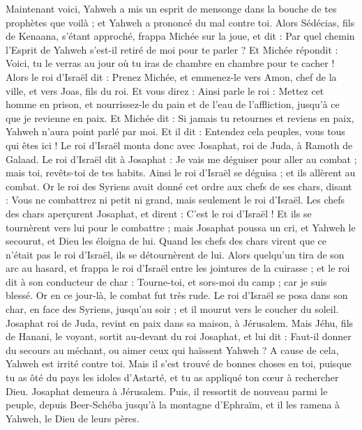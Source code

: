 \begin{multicols}{2}
Maintenant voici, Yahweh a mis un esprit de mensonge dans la bouche de tes prophètes que voilà ; et Yahweh a prononcé du mal contre toi.
Alors Sédécias, fils de Kenaana, s'étant approché, frappa Michée sur la joue, et dit : Par quel chemin l'Esprit de Yahweh s'est-il retiré de moi pour te parler ?
Et Michée répondit : Voici, tu le verras au jour où tu iras de chambre en chambre pour te cacher !
Alors le roi d'Israël dit : Prenez Michée, et emmenez-le vers Amon, chef de la ville, et vers Joas, fils du roi.
Et vous direz : Ainsi parle le roi : Mettez cet homme en prison, et nourrissez-le du pain et de l'eau de l'affliction, jusqu'à ce que je revienne en paix.
Et Michée dit : Si jamais tu retournes et reviens en paix, Yahweh n'aura point parlé par moi. Et il dit : Entendez cela peuples, vous tous qui êtes ici !
Le roi d'Israël monta donc avec Josaphat, roi de Juda, à Ramoth de Galaad.
Le roi d'Israël dit à Josaphat : Je vais me déguiser pour aller au combat ; mais toi, revêts-toi de tes habits. Ainsi le roi d'Israël se déguisa ; et ils allèrent au combat.
Or le roi des Syriens avait donné cet ordre aux chefs de ses chars, disant : Vous ne combattrez ni petit ni grand, mais seulement le roi d'Israël.
Les chefs des chars aperçurent Josaphat, et dirent : C'est le roi d'Israël ! Et ils se tournèrent vers lui pour le combattre ; mais Josaphat poussa un cri, et Yahweh le secourut, et Dieu les éloigna de lui.
Quand les chefs des chars virent que ce n'était pas le roi d'Israël, ils se détournèrent de lui.
Alors quelqu'un tira de son arc au hasard, et frappa le roi d'Israël entre les jointures de la cuirasse ; et le roi dit à son conducteur de char : Tourne-toi, et sors-moi du camp ; car je suis blessé.
Or en ce jour-là, le combat fut très rude. Le roi d'Israël se posa dans son char, en face des Syriens, jusqu'au soir ; et il mourut vers le coucher du soleil.
\VerseOne{}Josaphat roi de Juda, revint en paix dans sa maison, à Jérusalem.
Mais Jéhu, fils de Hanani, le voyant, sortit au-devant du roi Josaphat, et lui dit : Faut-il donner du secours au méchant, ou aimer ceux qui haïssent Yahweh ? A cause de cela, Yahweh est irrité contre toi.
Mais il s'est trouvé de bonnes choses en toi, puisque tu as ôté du pays les idoles d'Astarté, et tu as appliqué ton cœur à rechercher Dieu.
Josaphat demeura à Jérusalem. Puis, il ressortit de nouveau parmi le peuple, depuis Beer-Schéba jusqu'à la montagne d'Ephraïm, et il les ramena à Yahweh, le Dieu de leurs pères.

\end{multicols}
